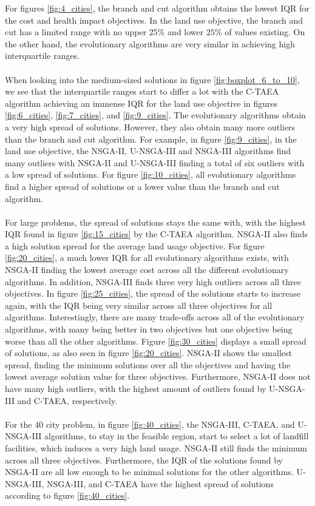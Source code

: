 \documentclass[mscthesis, 11pt]{usiinfthesis}
\theoremstyle{newdefinition}
\begin{document}
For figures \ref{fig:4_cities}, the branch and cut algorithm obtains the lowest IQR for the cost and health impact objectives. In the land use objective, the branch and cut has a limited range with no upper $25\%$ and lower $25\%$ of values existing. On the other hand, the evolutionary algorithms are very similar in achieving high interquartile ranges.
\\\\
When looking into the medium-sized solutions in figure \ref{fig:boxplot_6_to_10}, we see that the interquartile ranges start to differ a lot with the C-TAEA algorithm achieving an immense IQR for the land use objective in figures \ref{fig:6_cities}, \ref{fig:7_cities}, and \ref{fig:9_cities}. The evolutionary algorithms obtain a very high spread of solutions. However, they also obtain many more outliers than the branch and cut algorithm. For example, in figure \ref{fig:9_cities}, in the land use objective, the NSGA-II, U-NSGA-III and NSGA-III algorithms find many outliers with NSGA-II and U-NSGA-III finding a total of six outliers with a low spread of solutions. For figure \ref{fig:10_cities}, all evolutionary algorithms find a higher spread of solutions or a lower value than the branch and cut algorithm.
\\\\
For large problems, the spread of solutions stays the same with, with the highest IQR found in figure \ref{fig:15_cities} by the C-TAEA algorithm. NSGA-II also finds a high solution spread for the average land usage objective. For figure \ref{fig:20_cities}, a much lower IQR for all evolutionary algorithms exists, with NSGA-II finding the lowest average cost across all the different evolutionary algorithms. In addition, NSGA-III finds three very high outliers across all three objectives. In figure \ref{fig:25_cities}, the spread of the solutions starts to increase again, with the IQR being very similar across all three objectives for all algorithms. Interestingly, there are many trade-offs across all of the evolutionary algorithms, with many being better in two objectives but one objective being worse than all the other algorithms.
Figure \ref{fig:30_cities} displays a small spread of solutions, as also seen in figure \ref{fig:20_cities}. NSGA-II shows the smallest spread, finding the minimum solutions over all the objectives and having the lowest average solution value for three objectives. Furthermore, NSGA-II does not have many high outliers, with the highest amount of outliers found by U-NSGA-III and C-TAEA, respectively.
\\\\
For the 40 city problem, in figure \ref{fig:40_cities}, the NSGA-III, C-TAEA, and U-NSGA-III algorithms, to stay in the feasible region, start to select a lot of landfill facilities, which induces a very high land usage. NSGA-II still finds the minimum across all three objectives. Furthermore, the IQR of the solutions found by NSGA-II are all low enough to be minimal solutions for the other algorithms. U-NSGA-III, NSGA-III, and C-TAEA have the highest spread of solutions according to figure \ref{fig:40_cities}.
\end{document}
